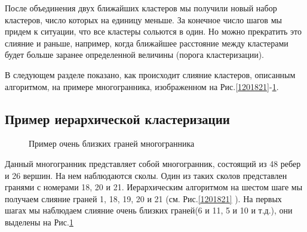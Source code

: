 \documentclass[a4paper,12pt, titlepage]{article}
\begin{document}
После объединения двух ближайших кластеров мы получили новый набор кластеров, число которых на единицу меньше. 
За конечное число шагов мы придем к ситуации, что все кластеры сольются в один. Но можно прекратить это слияние и раньше,
например, когда ближайшее расстояние между кластерами будет больше заранее определенной величины (порога кластеризации).

В следующем разделе показано, как происходит слияние кластеров, описанным алгоритмом, на примере многогранника, 
изображенном на Рис.\ref{1201821}-\ref{510611}.
\subsection{Пример иерархической кластеризации}
\begin{figure}[h]
\noindent
\begin{multicols}{2}
\noindent{}		
	\caption{Объединение граней 1, 19, 20, 18, 21  в кластер}
	\label{1201821}
\noindent{}		
	\caption{Пример очень близких граней многогранника}
	\label{510611}
\end{multicols}
\end{figure}
Данный многогранник представляет собой многогранник, состоящий из 48 ребер и 26 вершин. На нем наблюдаются сколы. Один 
из таких сколов представлен гранями с номерами 18, 20 и 21. Иерархическим алгоритмом на шестом шаге мы получаем 
слияние граней 1, 18, 19, 20 и 21 (см. Рис.\ref{1201821} ). На первых шагах мы наблюдаем слияние очень близких граней(6 и 11, 5 и 10 и т.д.), они  выделены на Рис.\ref{510611}
\end{document}
